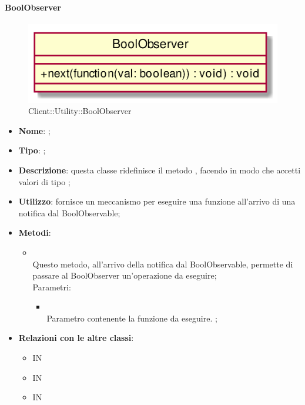 \hypertarget{BoolObserver_label}{\paragraph{BoolObserver}}
\begin{figure}[h]
	\centering
	\includegraphics[width=\textwidth,height=\textheight,keepaspectratio]{images/ClassBoolObserver.png}
	\caption{Client::Utility::BoolObserver}
\end{figure}
\begin{itemize}
	\item \textbf{Nome}: ;
	\item \textbf{Tipo}: ;
	\item \textbf{Descrizione}: questa classe ridefinisce il metodo , facendo in modo che accetti valori di tipo ;
	\item \textbf{Utilizzo}: fornisce un meccanismo per eseguire una funzione all'arrivo di una notifica dal BoolObservable;
	\item \textbf{Metodi}:
	\begin{itemize}
		\item[]  \\
		Questo metodo, all'arrivo della notifica dal BoolObservable, permette di passare al BoolObserver un'operazione da eseguire;\\
		Parametri:
		\begin{itemize}
			\item {} \\
			Parametro contenente la funzione da eseguire.
;
		\end{itemize}
	\end{itemize}
	\item \textbf{Relazioni con le altre classi}:
	\begin{itemize}
		\item IN \hyperlink{Recorder_label}{}
		\item IN \hyperlink{BoolObservable_label}{}
		\item IN \hyperlink{BoolSubject_label}{}
	\end{itemize}
\end{itemize}
\FloatBarrier

